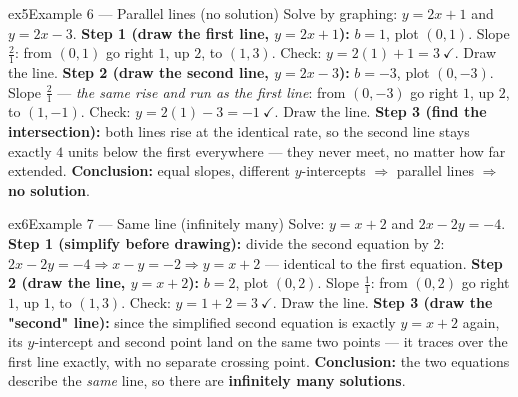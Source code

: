 \documentclass[11pt]{article}
\begin{document}
\begin{example}{ex5}{Example 6 --- Parallel lines (no solution)}
Solve by graphing: $y=2x+1$ and $y=2x-3$.
\soln \textbf{Step 1 (draw the first line, $y=2x+1$):} $b=1$, plot $(0,1)$. Slope $\tfrac21$: from $(0,1)$ go right $1$, up $2$, to $(1,3)$. Check: $y=2(1)+1=3\ \checkmark$. Draw the line.
\textbf{Step 2 (draw the second line, $y=2x-3$):} $b=-3$, plot $(0,-3)$. Slope $\tfrac21$ --- \emph{the same rise and run as the first line}: from $(0,-3)$ go right $1$, up $2$, to $(1,-1)$. Check: $y=2(1)-3=-1\ \checkmark$. Draw the line.
\textbf{Step 3 (find the intersection):} both lines rise at the identical rate, so the second line stays exactly $4$ units below the first everywhere --- they never meet, no matter how far extended.
\textbf{Conclusion:} equal slopes, different $y$-intercepts $\Rightarrow$ parallel lines $\Rightarrow$ \textbf{no solution}.
\end{example}

\begin{example}{ex6}{Example 7 --- Same line (infinitely many)}
Solve: $y=x+2$ and $2x-2y=-4$.
\soln \textbf{Step 1 (simplify before drawing):} divide the second equation by $2$: $2x-2y=-4\Rightarrow x-y=-2\Rightarrow y=x+2$ --- identical to the first equation.
\textbf{Step 2 (draw the line, $y=x+2$):} $b=2$, plot $(0,2)$. Slope $\tfrac11$: from $(0,2)$ go right $1$, up $1$, to $(1,3)$. Check: $y=1+2=3\ \checkmark$. Draw the line.
\textbf{Step 3 (draw the "second" line):} since the simplified second equation is exactly $y=x+2$ again, its $y$-intercept and second point land on the same two points --- it traces over the first line exactly, with no separate crossing point.
\textbf{Conclusion:} the two equations describe the \emph{same} line, so there are \textbf{infinitely many solutions}.
\end{example}
\end{document}
